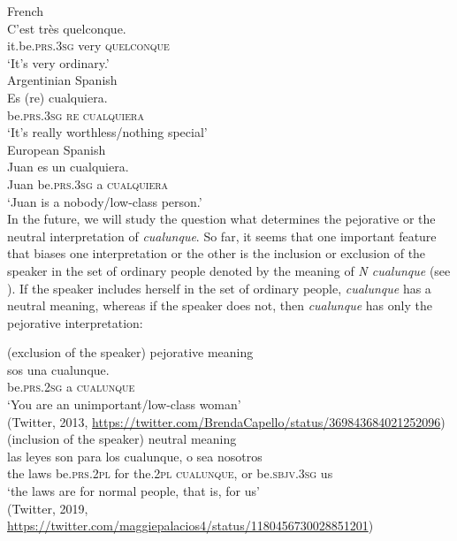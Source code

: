 \documentclass[output=paper,colorlinks,citecolor=brown]{langscibook}
\begin{document}
    \ex \label{ex:fk74}
    French\\
    \gll C’est très quelconque.\\
    {it.be.\textsc{prs.3sg}} very \textsc{quelconque}\\
    \glt ‘It’s very ordinary.’\\
    
    \ex \label{ex:fk75} 
    Argentinian Spanish\\
    \gll Es (re) cualquiera.\\
    be.\textsc{prs.3sg} \textsc{re} \textsc{cualquiera}\\
    \glt ‘It’s really worthless/nothing special’\\
    
     \ex \label{ex:fk76}
     European Spanish\\
    \gll Juan es un cualquiera.\\
    Juan be.\textsc{prs.3sg} a \textsc{cualquiera}\\
    \glt ‘Juan is a nobody/low-class person.’\\
\z
In the future, we will study the question what determines the pejorative or the neutral interpretation of \textit{cualunque}. So far, it seems that one important feature that biases one interpretation or the other is the inclusion or exclusion of the speaker in the set of ordinary people denoted by the meaning of \textit{N cualunque} (see  ). If the speaker includes herself in the set of ordinary people, \textit{cualunque} has a neutral meaning, whereas if the speaker does not, then \textit{cualunque} has only the pejorative interpretation:

\ea \label{ex:fk77}
 (exclusion of the speaker) pejorative meaning\\
    \gll sos una cualunque.\\
     be.\textsc{prs.2sg} a \textsc{cualunque}\\
    \glt ‘You are an unimportant/low-class woman’\\
    (Twitter, 2013, \url{https://twitter.com/BrendaCapello/status/369843684021252096})\\
    
\ex \label{ex:fk78}
(inclusion of the speaker) neutral meaning\\
\gll las leyes son para los cualunque, o sea nosotros\\
the laws be.\textsc{prs.2pl} for the.\textsc{2pl} \textsc{cualunque}, or be.\textsc{sbjv.3sg} us\\
\glt ‘the laws are for normal people, that is, for us’\\
(Twitter, 2019, \url{https://twitter.com/maggiepalacios4/status/1180456730028851201})\\
\z
\end{document}
